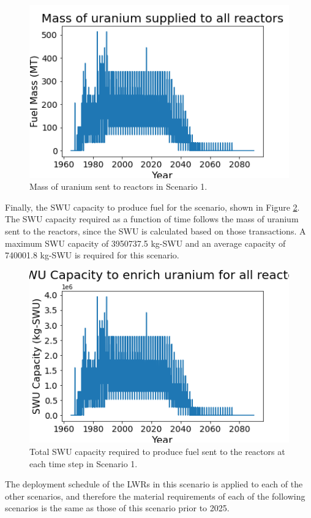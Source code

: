 \begin{figure}
    \centering 
    \includegraphics[scale=0.5]{figures/fuelsupply_scenarios_1.png}
    \caption{Mass of uranium sent to reactors in Scenario 1.}
    \label{fig:fuel_1}
\end{figure}

Finally, the \gls{SWU} capacity to produce fuel for the scenario, shown in 
Figure \ref{fig:swu_1}. The \gls{SWU} capacity required as a function of 
time follows the mass of uranium sent to the reactors, since the \gls{SWU}
is calculated based on those transactions. A maximum \gls{SWU} capacity of 
3950737.5 kg-\gls{SWU} and an average capacity of 740001.8 kg-\gls{SWU} is 
required for this scenario.

\begin{figure}
    \centering
    \includegraphics[scale=0.5]{figures/totalswu_scenarios_1.png}
    \caption{Total \gls{SWU} capacity required to produce fuel sent to the 
    reactors at each time step in Scenario 1.}
    \label{fig:swu_1}
\end{figure}

The deployment schedule of the \glspl{LWR} in this scenario is 
applied to each of the other scenarios, and therefore the material 
requirements of each of the following scenarios is the same as those 
of this scenario prior to 2025. 

